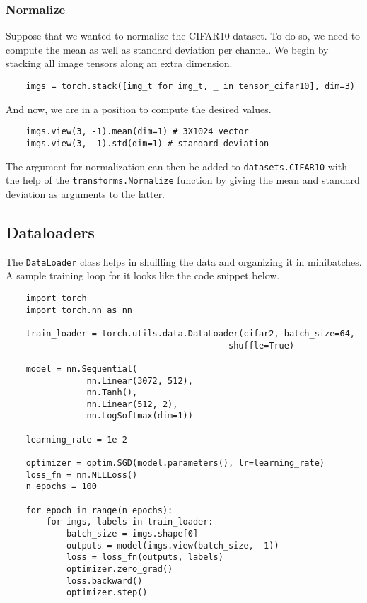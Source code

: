 \documentclass[11pt]{article}
\begin{document}
\subsubsection{Normalize}
\label{sec:org217902b}
Suppose that we wanted to normalize the CIFAR10 dataset. To do so, we need to compute the mean as well as standard deviation per channel. We begin by stacking all image tensors along an extra dimension.
\begin{verbatim}
    imgs = torch.stack([img_t for img_t, _ in tensor_cifar10], dim=3)
\end{verbatim}
And now, we are in a position to compute the desired values.
\begin{verbatim}
    imgs.view(3, -1).mean(dim=1) # 3X1024 vector
    imgs.view(3, -1).std(dim=1) # standard deviation
\end{verbatim}
The argument for normalization can then be added to \texttt{datasets.CIFAR10} with the help of the \texttt{transforms.Normalize} function by giving the mean and standard deviation as arguments to the latter.

\subsection{Dataloaders}
\label{sec:org0088117}
The \texttt{DataLoader} class helps in shuffling the data and organizing it in minibatches. A sample training loop for it looks like the code snippet below.
\begin{verbatim}
    import torch
    import torch.nn as nn

    train_loader = torch.utils.data.DataLoader(cifar2, batch_size=64,
                                            shuffle=True)

    model = nn.Sequential(
                nn.Linear(3072, 512),
                nn.Tanh(),
                nn.Linear(512, 2),
                nn.LogSoftmax(dim=1))

    learning_rate = 1e-2

    optimizer = optim.SGD(model.parameters(), lr=learning_rate)
    loss_fn = nn.NLLLoss()
    n_epochs = 100

    for epoch in range(n_epochs):
        for imgs, labels in train_loader:
            batch_size = imgs.shape[0]
            outputs = model(imgs.view(batch_size, -1))
            loss = loss_fn(outputs, labels)
            optimizer.zero_grad()
            loss.backward()
            optimizer.step()
\end{verbatim}
\end{document}
